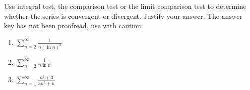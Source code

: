 Use integral test, the comparison test or the limit comparison test to determine whether the series is convergent or divergent. Justify your answer. The answer key has not been proofread, use with caution.
\begin{enumerate}
\item $\displaystyle \sum\limits_{n=2}^{\infty}\frac{1}{n(\ln n)^2}$
\item $\displaystyle \sum\limits_{n=2}^{\infty}\frac{1}{n\ln n}$
\item $\displaystyle \sum\limits_{n=1}^{\infty}\frac{n^2+3}{3n^5+n}$
\end{enumerate}